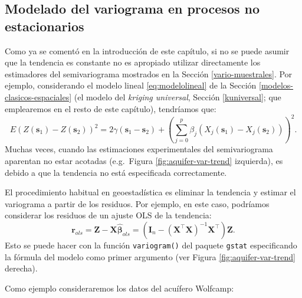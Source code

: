 \documentclass[
]{book}
\newenvironment{Shaded}{\begin{snugshade}}{\end{snugshade}}
\newcommand{\AttributeTok}[1]{\textcolor[rgb]{0.13,0.29,0.53}{#1}}
\newcommand{\CommentTok}[1]{\textcolor[rgb]{0.56,0.35,0.01}{\textit{#1}}}
\newcommand{\ConstantTok}[1]{\textcolor[rgb]{0.56,0.35,0.01}{#1}}
\newcommand{\DecValTok}[1]{\textcolor[rgb]{0.00,0.00,0.81}{#1}}
\newcommand{\FloatTok}[1]{\textcolor[rgb]{0.00,0.00,0.81}{#1}}
\newcommand{\FunctionTok}[1]{\textcolor[rgb]{0.13,0.29,0.53}{\textbf{#1}}}
\newcommand{\NormalTok}[1]{#1}
\newcommand{\SpecialCharTok}[1]{\textcolor[rgb]{0.81,0.36,0.00}{\textbf{#1}}}
\newcommand{\StringTok}[1]{\textcolor[rgb]{0.31,0.60,0.02}{#1}}
\theoremstyle{break}
\theoremstyle{definition}
\theoremstyle{definition}
\theoremstyle{definition}
\theoremstyle{definition}
\theoremstyle{remark}
\begin{document}
\begin{Shaded}
\end{Shaded}

\subsection{Modelado del variograma en procesos no estacionarios}\label{trend-fit}

Como ya se comentó en la introducción de este capítulo, si no se puede asumir que la tendencia es constante no es apropiado utilizar directamente los estimadores del semivariograma mostrados en la Sección \ref{vario-muestrales}.
Por ejemplo, considerando el modelo lineal \eqref{eq:modelolineal} de la Sección \ref{modelos-clasicos-espaciales} (el modelo del \emph{kriging universal}, Sección \ref{kuniversal}; que emplearemos en el resto de este capítulo), tendríamos que:
\[E(Z(\mathbf{s}_1)-Z(\mathbf{s}_{2}))^2 =2\gamma(\mathbf{s}_1
-\mathbf{s}_{2}) + \left( \sum\limits_{j=0}^{p}\beta_{j}  \left( X_{j}
(\mathbf{s}_1)-X_{j}(\mathbf{s}_{2})\right) \right)^2.\]
Muchas veces, cuando las estimaciones experimentales del semivariograma aparentan no estar acotadas (e.g.~Figura \ref{fig:aquifer-var-trend} izquierda), es debido a que la tendencia no está especificada correctamente.

El procedimiento habitual en geoestadística es eliminar la tendencia y estimar el variograma a partir de los residuos. Por ejemplo, en este caso, podríamos considerar los residuos de un ajuste OLS de la tendencia:
\[\mathbf{r}_{ols} =\mathbf{Z}-\mathbf{X}\hat{\boldsymbol{\beta}}_{ols} =\left( \mathbf{I}_{n}
- (\mathbf{X}^{\top}\mathbf{X})^{-1}\mathbf{X}^{\top} \right)\mathbf{Z}.\]
Esto se puede hacer con la función \texttt{variogram()} del paquete \texttt{gstat} especificando la fórmula del modelo como primer argumento (ver Figura \ref{fig:aquifer-var-trend} derecha).

Como ejemplo consideraremos los datos del acuífero Wolfcamp:
\end{document}
